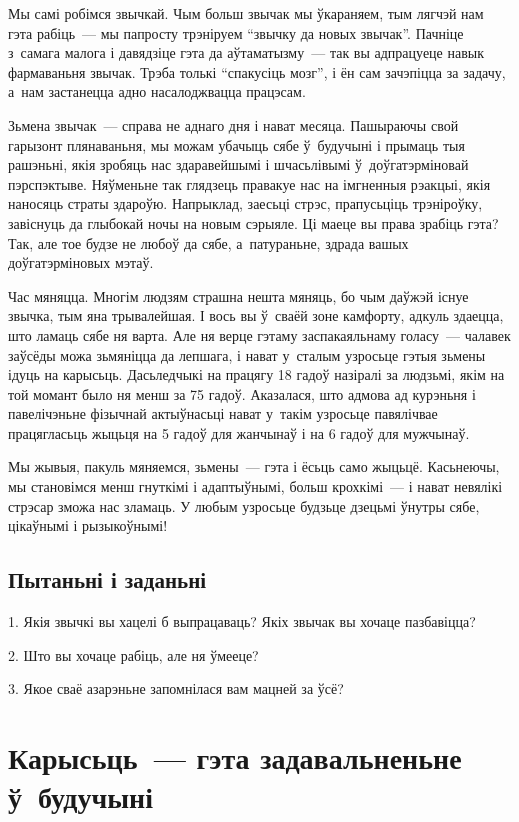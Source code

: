 Мы самі робімся звычкай. Чым больш звычак мы ўкараняем, тым лягчэй нам гэта рабіць~--- мы папросту трэніруем ``звычку да новых звычак''. Пачніце з~самага малога і давядзіце гэта да аўтаматызму~--- так вы адпрацуеце навык фармаваньня звычак. Трэба толькі ``спакусіць мозг'', і ён сам зачэпіцца за задачу, а~нам застанецца адно насалоджвацца працэсам.

Зьмена звычак~--- справа не аднаго дня і нават месяца. Пашыраючы свой гарызонт плянаваньня, мы можам убачыць сябе ў~будучыні і прымаць тыя рашэньні, якія зробяць нас здаравейшымі і шчасьлівымі ў~доўгатэрміновай пэрспэктыве. Няўменьне так глядзець правакуе нас на імгненныя рэакцыі, якія наносяць страты здароўю. Напрыклад, заесьці стрэс, прапусьціць трэніроўку, завіснуць да глыбокай ночы на новым сэрыяле. Ці маеце вы права зрабіць гэта? Так, але тое будзе не любоў да сябе, а~патураньне, здрада вашых доўгатэрміновых мэтаў.

Час мяняцца. Многім людзям страшна нешта мяняць, бо чым даўжэй існуе звычка, тым яна трывалейшая. І вось вы ў~сваёй зоне камфорту, адкуль здаецца, што ламаць сябе ня варта. Але ня верце гэтаму заспакаяльнаму голасу~--- чалавек заўсёды можа зьмяніцца да лепшага, і нават у~сталым узросьце гэтыя зьмены ідуць на карысьць. Дасьледчыкі на працягу 18 гадоў назіралі за людзьмі, якім на той момант было ня менш за 75 гадоў. Аказалася, што адмова ад курэньня і павелічэньне фізычнай актыўнасьці нават у~такім узросьце павялічвае працягласьць жыцьця на 5 гадоў для жанчынаў і на 6 гадоў для мужчынаў.

Мы жывыя, пакуль мяняемся, зьмены~--- гэта і ёсьць само жыцьцё. Касьнеючы, мы становімся менш гнуткімі і адаптыўнымі, больш крохкімі~--- і нават невялікі стрэсар зможа нас зламаць. У любым узросьце будзьце дзецьмі ўнутры сябе, цікаўнымі і рызыкоўнымі!

\subsection*{Пытаньні і заданьні}

1. Якія звычкі вы хацелі б выпрацаваць? Якіх звычак вы хочаце пазбавіцца?

2. Што вы хочаце рабіць, але ня ўмееце?

3. Якое сваё азарэньне запомнілася вам мацней за ўсё?


\section{Карысьць~--- гэта задавальненьне ў~будучыні}

